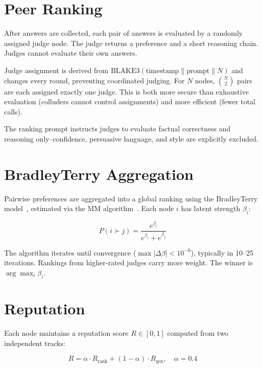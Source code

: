 \documentclass[11pt,a4paper]{article}
\begin{document}
\section{Peer Ranking}

After answers are collected, each pair of answers is evaluated by a randomly assigned judge node. The judge returns a preference and a short reasoning chain. Judges cannot evaluate their own answers.

Judge assignment is derived from $\text{BLAKE3}(\text{timestamp} \| \text{prompt} \| N)$ and changes every round, preventing coordinated judging. For $N$ nodes, $\binom{N}{2}$ pairs are each assigned exactly one judge. This is both more secure than exhaustive evaluation (colluders cannot control assignments) and more efficient (fewer total calls).

The ranking prompt instructs judges to evaluate factual correctness and reasoning only--confidence, persuasive language, and style are explicitly excluded.

\section{BradleyTerry Aggregation}

Pairwise preferences are aggregated into a global ranking using the BradleyTerry model~\cite{bt}, estimated via the MM algorithm~\cite{mm}. Each node $i$ has latent strength $\beta_i$:

\begin{equation}
P(i \succ j) = \frac{e^{\beta_i}}{e^{\beta_i} + e^{\beta_j}}
\end{equation}

The algorithm iterates until convergence ($\max|\Delta\beta| < 10^{-6}$), typically in 10--25 iterations. Rankings from higher-rated judges carry more weight. The winner is $\arg\max_i \beta_i$.

\section{Reputation}

Each node maintains a reputation score $R \in [0, 1]$ computed from two independent tracks:

\begin{equation}
R = \alpha \cdot R_{\text{rank}} + (1 - \alpha) \cdot R_{\text{gen}}, \quad \alpha = 0.4
\end{equation}
\end{document}
